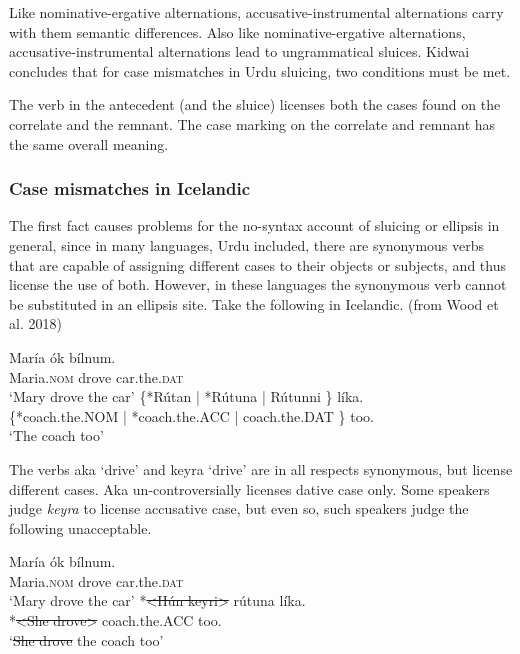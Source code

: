 \documentclass{turabian-researchpaper}
\begin{document}
Like nominative-ergative alternations, accusative-instrumental alternations carry with them semantic differences. Also like nominative-ergative alternations, accusative-instrumental alternations lead to ungrammatical sluices. Kidwai concludes that for case mismatches in Urdu sluicing, two conditions must be met. 

\begin{exe}
\ex\label{kidwaicond} 
\begin{xlist}
\ex The verb in the antecedent (and the sluice) licenses both the cases found on the correlate and the remnant. 
\ex The case marking on the correlate and remnant has the same overall meaning. 
\end{xlist}
\end{exe}

\subsubsection{Case mismatches in Icelandic} 
The first fact causes problems for the no-syntax account of sluicing or ellipsis in general, since in many languages, Urdu included, there are synonymous verbs that are capable of assigning different cases to their objects or subjects, and thus license the use of both. However, in these languages the synonymous verb cannot be substituted in an ellipsis site. Take the following in Icelandic. (from Wood et al. 2018) 

\begin{exe}
\ex\label{mariadrove1}
\gll {} Mar\'ia \'ok b\'ilnum. \\
{} Maria.\textsc{nom} drove car.the.\textsc{dat} \\
\trans `Mary drove the car' 
\gll {}  \{*R\'utan | *R\'utuna | R\'utunni \} l\'ika. \\ 
{} \{*coach.the.NOM | *coach.the.ACC | coach.the.DAT \} too. \\
\trans `The coach too' 
\end{exe}

The verbs aka `drive' and keyra `drive' are in all respects synonymous, but license different cases. Aka un-controversially licenses dative case only. Some speakers judge \textit{keyra} to license accusative case, but even so, such speakers judge the following unacceptable.  

\begin{exe}
\ex\label{mariadrove2}
\gll {} Mar\'ia \'ok b\'ilnum. \\
{} Maria.\textsc{nom} drove car.the.\textsc{dat} \\
\trans `Mary drove the car' 
\gll {} *\sout{\textless H\'un keyr\dh i\textgreater} r\'utuna l\'ika. \\ 
{} *\sout{\textless She drove\textgreater} coach.the.ACC  too. \\
\trans `\sout{She drove} the coach too' 
\end{exe}
\end{document}
